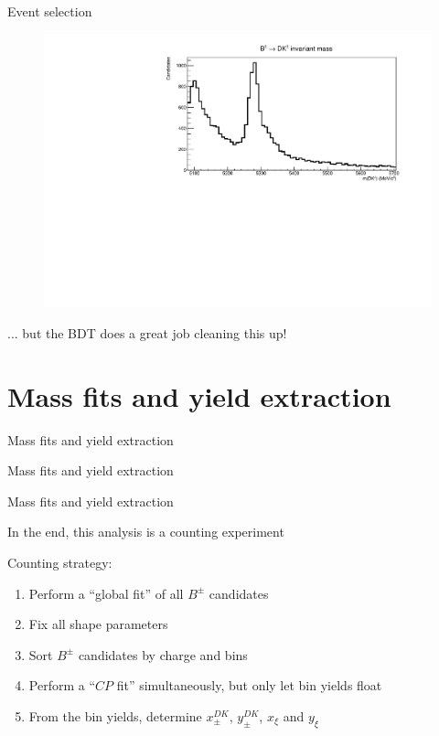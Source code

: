 \documentclass{beamer}
\begin{document}
\begin{frame}{Event selection}
  \begin{figure}
    \centering
    \includegraphics[width = 1.0\textwidth]{Plots/BmassFinalSelection.pdf}
  \end{figure}
  \begin{center}
    ... but the BDT does a great job cleaning this up!
  \end{center}
\end{frame}

\section{Mass fits and yield extraction}
\begin{frame}{Mass fits and yield extraction}
  \begin{center}
    {\huge Mass fits and yield extraction}
  \end{center}
\end{frame}

\begin{frame}{Mass fits and yield extraction}
  \begin{center}
    \large In the end, this analysis is a counting experiment
  \end{center}
  Counting strategy:
  \begin{enumerate}
    \setlength\itemsep{1.0em}
    \item{Perform a ``global fit'' of all $B^\pm$ candidates}
    \item{Fix all shape parameters}
    \item{Sort $B^\pm$ candidates by charge and bins}
    \item{Perform a ``$C\!P$ fit'' simultaneously, but only let bin yields float}
    \item{From the bin yields, determine $x_\pm^{DK}$, $y_\pm^{DK}$, $x_\xi$ and $y_\xi$}
  \end{enumerate}
\end{frame}
\end{document}
